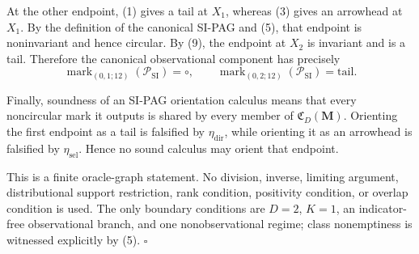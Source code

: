 At the other endpoint, (1) gives a tail at \(X_1\), whereas (3) gives an arrowhead at \(X_1\).  By the definition of the canonical SI-PAG and (5), that endpoint is noninvariant and hence circular.  By (9), the endpoint at \(X_2\) is invariant and is a tail.  Therefore the canonical observational component has precisely
\[
 \operatorname{mark}_{(0,1;12)}(\mathcal P_{\mathrm{SI}})=\circ,
 \qquad
 \operatorname{mark}_{(0,2;12)}(\mathcal P_{\mathrm{SI}})=\mathrm{tail}. \tag{10}
\]

Finally, soundness of an SI-PAG orientation calculus means that every noncircular mark it outputs is shared by every member of \(\mathfrak C_D(\mathbf M)\).  Orienting the first endpoint as a tail is falsified by \(\eta_{\mathrm{dir}}\), while orienting it as an arrowhead is falsified by \(\eta_{\mathrm{sel}}\).  Hence no sound calculus may orient that endpoint.

This is a finite oracle-graph statement.  No division, inverse, limiting argument, distributional support restriction, rank condition, positivity condition, or overlap condition is used.  The only boundary conditions are \(D=2\), \(K=1\), an indicator-free observational branch, and one nonobservational regime; class nonemptiness is witnessed explicitly by (5). \(\square\)